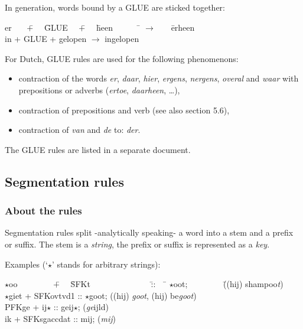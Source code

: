 In generation, words bound by a GLUE are sticked together:

\begin{tabbing}
er \ \ \  \= + \ \  \= GLUE \ \  \= + \ \  \= heen \ \ \ \ \ \   \= 
$\longrightarrow$ \ \ \ \= erheen \\
in \> + \> GLUE \> + \> gelopen \> $\longrightarrow$ \> ingelopen \\
\end{tabbing}

For Dutch, GLUE rules are used for the following phenomenons:
\begin{itemize}
 \item contraction of the words {\em er}, {\em daar}, {\em hier}, {\em ergens},
 {\em nergens}, {\em overal} and {\em waar} with prepositions or adverbs 
       ({\em ertoe}, {\em daarheen}, \ldots ),
 \item contraction of prepositions and verb (see also section 5.6),
 \item contraction of {\em van} and {\em de} to: {\em der}.
\end{itemize}

The GLUE rules are listed in a separate document.

\subsection{Segmentation rules}

\subsubsection{About the rules}

Segmentation rules split -analytically speaking- a word into a stem and a 
prefix or suffix. The stem is a {\em string}, 
the prefix or suffix is represented as a {\em key}. 

Examples (`$\star$' stands for arbitrary strings):

\begin{tabbing}
$\star$oo  \ \ \ \ \ \ \ \   \= + \ \  \= SFKt \ \ \ \ \ \ \ \ \ \ \ \ \ \ 
\= :: \ \  \= $\star$oot;  \ \ \ \ \ \ \ \   \= ((hij) shampoo{\em t}) \\
$\star$giet \> + \> SFKovtvd1 \> :: \> $\star$goot; \> ((hij) {\em goot}, (hij) 
be{\em goot}) \\
PFKge       \> + \> ij$\star$ \> :: \> geij$\star$; \> ({\em ge}ijld)      \\
ik          \> + \> SFKsgaccdat  \> :: \> mij;      \> ({\em mij})         \\
\end{tabbing}

